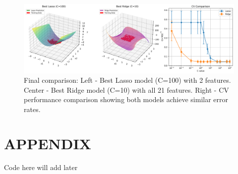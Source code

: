\documentclass[11pt,a4paper]{article}
\begin{document}
\begin{figure}[H]
\centering
\includegraphics[width=\textwidth]{figures/08_final_comparison.png}
\caption{Final comparison: Left - Best Lasso model (C=100) with 2 features. Center - Best Ridge model (C=10) with all 21 features. Right - CV performance comparison showing both models achieve similar error rates.}
\label{fig:final_comparison}
\end{figure}

\section*{APPENDIX}

Code here will add later 
\end{document}

